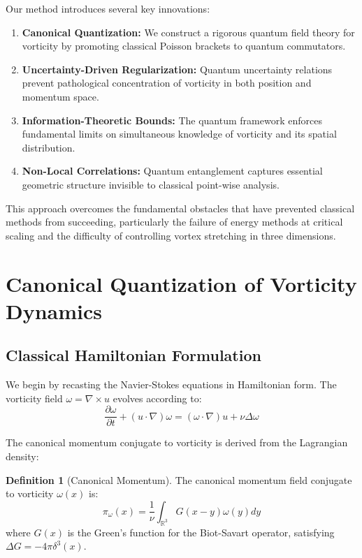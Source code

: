 \documentclass[11pt,a4paper]{article}
\theoremstyle{definition}
\newtheorem{definition}[theorem]{Definition}
\theoremstyle{remark}
\newcommand{\R}{\mathbb{R}}
\newcommand{\pd}[2]{\frac{\partial #1}{\partial #2}}
\begin{document}
Our method introduces several key innovations:

\begin{enumerate}
    \item \textbf{Canonical Quantization:} We construct a rigorous quantum field theory for vorticity by promoting classical Poisson brackets to quantum commutators.
    
    \item \textbf{Uncertainty-Driven Regularization:} Quantum uncertainty relations prevent pathological concentration of vorticity in both position and momentum space.
    
    \item \textbf{Information-Theoretic Bounds:} The quantum framework enforces fundamental limits on simultaneous knowledge of vorticity and its spatial distribution.
    
    \item \textbf{Non-Local Correlations:} Quantum entanglement captures essential geometric structure invisible to classical point-wise analysis.
\end{enumerate}

This approach overcomes the fundamental obstacles that have prevented classical methods from succeeding, particularly the failure of energy methods at critical scaling and the difficulty of controlling vortex stretching in three dimensions.

\section{Canonical Quantization of Vorticity Dynamics}

\subsection{Classical Hamiltonian Formulation}

We begin by recasting the Navier-Stokes equations in Hamiltonian form. The vorticity field $\omega = \nabla \times u$ evolves according to:
\begin{equation}
\pd{\omega}{t} + (u \cdot \nabla)\omega = (\omega \cdot \nabla)u + \nu \Delta \omega
\label{eq:vorticity_eq}
\end{equation}

The canonical momentum conjugate to vorticity is derived from the Lagrangian density:

\begin{definition}[Canonical Momentum]
\label{def:canonical_momentum}
The canonical momentum field conjugate to vorticity $\omega(x)$ is:
\begin{equation}
\pi_\omega(x) = \frac{1}{\nu} \int_{\R^3} G(x-y) \omega(y) dy
\end{equation}
where $G(x)$ is the Green's function for the Biot-Savart operator, satisfying $\Delta G = -4\pi \delta^3(x)$.
\end{definition}
\end{document}
